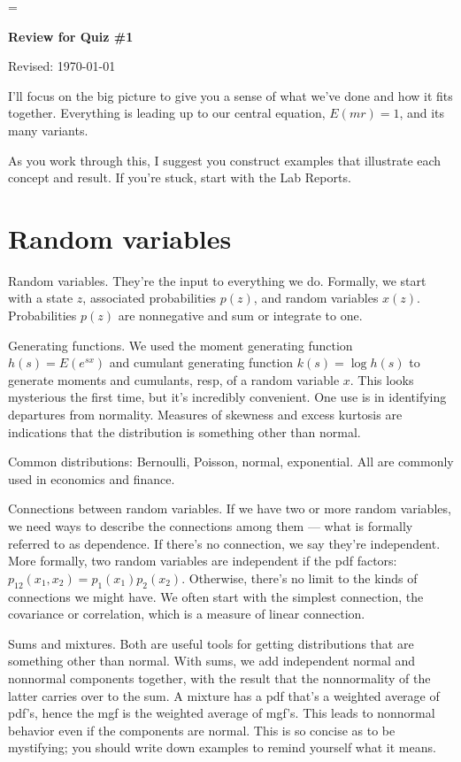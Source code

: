 \documentclass[11pt]{article}
\begin{document}
\parskip=\bigskipamount
\parindent=0.0in
\thispagestyle{empty}


\bigskip\bigskip
\centerline{\Large \bf Review for Quiz \#1}
\centerline{Revised: \today}

\bigskip
I'll focus on the big picture to give you a sense of
what we've done and how it fits together.
Everything is leading up to our central equation,
$ E(mr) = 1$, and its many variants.

As you work through this, I suggest you construct examples that
illustrate each concept and result.
If you're stuck, start with the Lab Reports.


\section*{Random variables}

Random variables.  They're the input to everything we do.
Formally, we start with a state $z$, associated probabilities $p(z)$,
and random variables $x(z)$.
Probabilities $p(z)$ are nonnegative and sum or integrate to one.

Generating functions.
We used the moment generating function $h(s) = E (e^{sx})$
and cumulant generating function $k(s) = \log h(s)$ to
generate moments and cumulants, resp, of a random variable $x$.
This looks mysterious the first time, but it's incredibly convenient.
One use is in identifying departures from normality.
Measures of skewness and excess kurtosis are
indications that the distribution is something other than normal.

Common distributions:  Bernoulli, Poisson, normal, exponential.
All are commonly used in economics and finance.

Connections between random variables.
If we have two or more random variables, we need ways to describe
the connections among them --- what is formally referred to as dependence.  
If there's no connection, we say they're independent.
More formally, two random variables are independent if the pdf factors:
$ p_{12}(x_1, x_2) = p_1(x_1) p_2(x_2) $.
Otherwise, there's no limit to the kinds of connections we might have.
We often start with the simplest connection,
the covariance or correlation, which is a measure of linear connection.

Sums and mixtures.
Both are useful tools for getting distributions that are something other than normal.
With sums, we add independent normal and nonnormal components together,
with the result that the nonnormality of the latter carries over to the sum.
A mixture has a pdf that's a weighted average
of pdf's, hence the mgf is the weighted average of mgf's.
This leads to nonnormal behavior even if the components are normal.
This is so concise as to be mystifying; you should write down examples
to remind yourself what it means.
\end{document}
